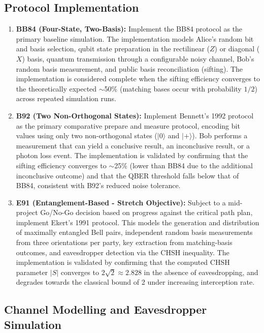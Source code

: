 \documentclass[10pt, a4paper]{report}
\begin{document}
\subsection{Protocol Implementation}

\begin{enumerate}[label=\textbf{O2.\arabic*}, leftmargin=1.5cm]
    \item \textbf{BB84 (Four-State, Two-Basis):} Implement the BB84 protocol as the primary baseline simulation. The implementation models Alice's random bit and basis selection, qubit state preparation in the rectilinear ($Z$) or diagonal ($X$) basis, quantum transmission through a configurable noisy channel, Bob's random basis measurement, and public basis reconciliation (sifting). The implementation is considered complete when the sifting efficiency converges to the theoretically expected $\sim$50\% (matching bases occur with probability $1/2$) across repeated simulation runs. %

    \item \textbf{B92 (Two Non-Orthogonal States):} Implement Bennett's 1992 protocol as the primary comparative prepare and measure protocol, encoding bit values using only two non-orthogonal states ($|0\rangle$ and $|+\rangle$). Bob performs a measurement that can yield a conclusive result, an inconclusive result, or a photon loss event. The implementation is validated by confirming that the sifting efficiency converges to $\sim$25\% (lower than BB84 due to the additional inconclusive outcome) and that the QBER threshold falls below that of BB84, consistent with B92's reduced noise tolerance.

    \item \textbf{E91 (Entanglement-Based - Stretch Objective):} Subject to a mid-project Go/No-Go decision based on progress against the critical path plan, implement Ekert's 1991 protocol. This models the generation and distribution of maximally entangled Bell pairs, independent random basis measurements from three orientations per party, key extraction from matching-basis outcomes, and eavesdropper detection via the CHSH inequality. The implementation is validated by confirming that the computed CHSH parameter $|S|$ converges to $2\sqrt{2} \approx 2.828$ in the absence of eavesdropping, and degrades towards the classical bound of 2 under increasing interception rate.
\end{enumerate}

\subsection{Channel Modelling and Eavesdropper Simulation}
\end{document}
